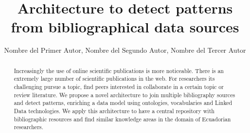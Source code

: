 \documentclass[11pt]{article}
\title{Architecture to detect patterns from bibliographical data sources }
\author{Nombre del Primer Autor\inst{1}, Nombre del Segundo Autor\inst{2}, Nombre del Tercer Autor\inst{1,3} }
\begin{document}
 


\renewcommand{\refname}{References}
\renewcommand{\tablename}{Table}
\renewcommand{\figurename}{Figure}

\maketitle

\begin{abstract}

%
Increasingly the use of online scientific publications is more noticeable. There is an extremely large number of scientific publications in the web. For researchers its challenging pursue a topic, find peers interested in collaborate in a certain topic or review literature. We propose a novel architecture to join multiple bibliography sources and detect patterns, %
enriching a data model using ontologies, vocabularies and Linked Data technologies. We apply this architecture to have a central repository with bibliographic resources and find similar knowledge areas in the domain of Ecuadorian researchers. 

\end{abstract}
\end{document}
